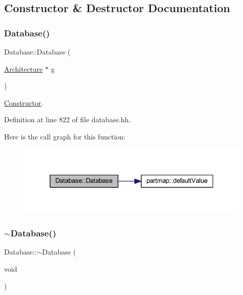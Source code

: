 \subsection{Constructor \& Destructor Documentation}
\mbox{\label{class_database_ab71b47881aadf1df2dc7655386449a85}} 
\subsubsection{\texorpdfstring{Database()}{Database()}}
{\footnotesize\ttfamily Database\+::\+Database (\begin{DoxyParamCaption}\item[{\mbox{\hyperlink{class_architecture}{Architecture}} $\ast$}]{g }\end{DoxyParamCaption})\hspace{0.3cm}{\ttfamily [inline]}}



\mbox{\hyperlink{class_constructor}{Constructor}}. 



Definition at line 822 of file database.\+hh.

Here is the call graph for this function\+:
\nopagebreak
\begin{figure}[H]
\begin{center}
\leavevmode
\includegraphics[width=332pt]{class_database_ab71b47881aadf1df2dc7655386449a85_cgraph}
\end{center}
\end{figure}
\mbox{\label{class_database_a46b5202fd52c60dc229a35aa181697a6}} 
\subsubsection{\texorpdfstring{$\sim$Database()}{~Database()}}
{\footnotesize\ttfamily Database\+::$\sim$\+Database (\begin{DoxyParamCaption}\item[{void}]{ }\end{DoxyParamCaption})}



